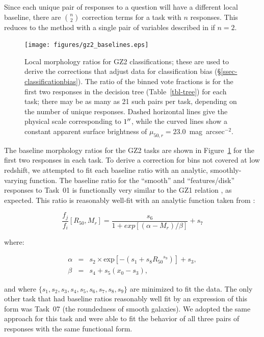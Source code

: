 \documentclass[useAMS,usenatbib]{mn2e}
\begin{document}
Since each unique pair of responses to a question will have a different local baseline, there are $\binom{n}{2}$ correction terms for a task with $n$ responses. This reduces to the method with a single pair of variables described in \citet{bam09} if $n=2$. 

\begin{figure}
\texttt{[image: figures/gz2\_baselines.eps]}
\caption{Local morphology ratios for GZ2 classifications; these are used to derive the corrections that adjust data for classification bias (\S\ref{ssec-classificationbias}). The ratio of the binned vote fractions is for the first two responses in the decision tree (Table~\ref{tbl-tree}) for each task; there may be as many as 21 such pairs per task, depending on the number of unique responses. Dashed horizontal lines give the physical scale corresponding to $1\hbox{$^{\prime\prime}$}$, while the curved lines show a constant apparent surface brightness of $\mu_{50,r}=23.0$~mag~arcsec$^{-2}$.
\label{fig-baselines}}
\end{figure}

The baseline morphology ratios for the GZ2 tasks are shown in Figure~\ref{fig-baselines} for the first two responses in each task. To derive a correction for bins not covered at low redshift, we attempted to fit each baseline ratio with an analytic, smoothly-varying function. The baseline ratio for the ``smooth'' and ``features/disk'' responses to Task~01 is functionally very similar to the GZ1 relation \citep[Figure~A5 in ][]{bam09}, as expected. This ratio is reasonably well-fit with an analytic function taken from \citet{bam09}: 

\begin{equation}
\frac{f_j}{f_i}[R_{50},M_r] = \frac{s_6}{1 + exp[(\alpha - M_r)/\beta]} + s_7
\label{eqn-sb}
\end{equation}

\noindent where:

\begin{eqnarray}
\alpha &=& s_2\times\text{exp}[{-\left(s_1 + s_8{R_{50}}^{s_9}\right)}] + s_3, \\
\beta  &=& s_4 + s_5(x_0 - s_3),
\end{eqnarray}

\noindent and where $\{s_1,s_2,s_3,s_4,s_5,s_6,s_7,s_8,s_9\}$ are minimized to fit the data. The only other task that had baseline ratios reasonably well fit by an expression of this form was Task~07 (the roundedness of smooth galaxies). We adopted the same approach for this task and were able to fit the behavior of all three pairs of responses with the same functional form. 
\end{document}

